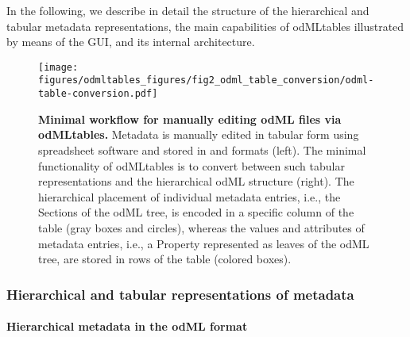 {In the following, we describe in detail the structure of the hierarchical and tabular metadata representations, the main capabilities of odMLtables illustrated by means of the GUI, and its internal architecture. 


\begin{figure}[!ht]
\begin{center}
\texttt{[image: figures/odmltables\_figures/fig2\_odml\_table\_conversion/odml-table-conversion.pdf]}
\caption[Minimal workflow for manually editing odML files via odMLtables]{{\label{fig:min_workflow}
\textbf{Minimal workflow for manually editing odML files via odMLtables.} Metadata is manually edited in tabular form using spreadsheet software and stored in  and  formats (left). The minimal functionality of odMLtables is to convert between such tabular representations and the hierarchical odML structure (right). The hierarchical placement of individual metadata entries, i.e., the Sections of the odML tree, is encoded in a specific column of the table (gray boxes and circles), whereas the values and attributes of metadata entries, i.e., a Property represented as leaves of the odML tree, are stored in rows of the table (colored boxes).%
}}
\end{center}
\end{figure}

\subsubsection{Hierarchical and tabular representations of metadata}
\label{sec:Hierarchical-Tabular}

\paragraph{Hierarchical metadata in the odML format}
\label{sec:subodML}

}
